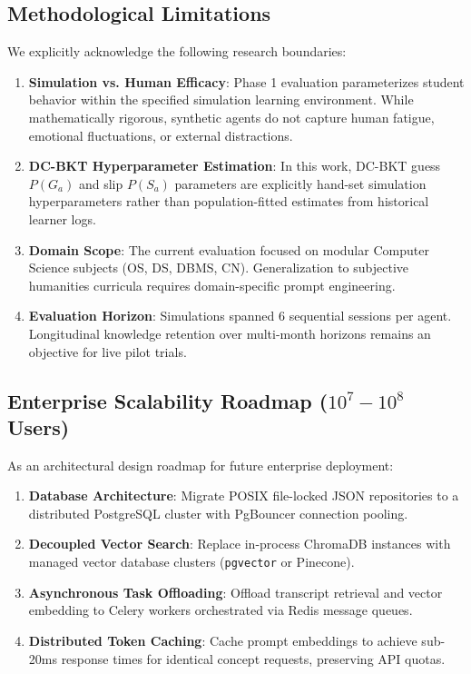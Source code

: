 \documentclass[journal]{IEEEtran}
\begin{document}
\subsection{Methodological Limitations}
We explicitly acknowledge the following research boundaries:
\begin{enumerate}
    \item \textbf{Simulation vs. Human Efficacy}: Phase 1 evaluation parameterizes student behavior within the specified simulation learning environment. While mathematically rigorous, synthetic agents do not capture human fatigue, emotional fluctuations, or external distractions.
    \item \textbf{DC-BKT Hyperparameter Estimation}: In this work, DC-BKT guess $P(G_a)$ and slip $P(S_a)$ parameters are explicitly hand-set simulation hyperparameters rather than population-fitted estimates from historical learner logs.
    \item \textbf{Domain Scope}: The current evaluation focused on modular Computer Science subjects (OS, DS, DBMS, CN). Generalization to subjective humanities curricula requires domain-specific prompt engineering.
    \item \textbf{Evaluation Horizon}: Simulations spanned 6 sequential sessions per agent. Longitudinal knowledge retention over multi-month horizons remains an objective for live pilot trials.
\end{enumerate}

\subsection{Enterprise Scalability Roadmap ($10^7 - 10^8$ Users)}
As an architectural design roadmap for future enterprise deployment:
\begin{enumerate}
    \item \textbf{Database Architecture}: Migrate POSIX file-locked JSON repositories to a distributed PostgreSQL cluster with PgBouncer connection pooling.
    \item \textbf{Decoupled Vector Search}: Replace in-process ChromaDB instances with managed vector database clusters (\texttt{pgvector} or Pinecone).
    \item \textbf{Asynchronous Task Offloading}: Offload transcript retrieval and vector embedding to Celery workers orchestrated via Redis message queues.
    \item \textbf{Distributed Token Caching}: Cache prompt embeddings to achieve sub-20ms response times for identical concept requests, preserving API quotas.
\end{enumerate}
\end{document}
